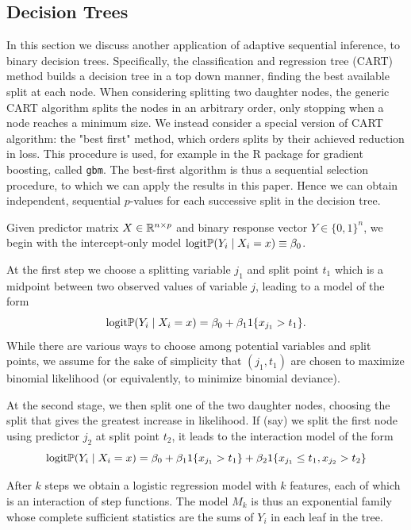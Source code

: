 \documentclass{article}
\begin{document}
\subsection{Decision Trees}
In this section we discuss another application of adaptive sequential inference, to binary decision trees. Specifically, the classification and regression tree  (CART)  method builds a decision tree in a top down manner, finding the best available split at each node.  When considering splitting two daughter nodes, the generic CART algorithm splits the nodes in an arbitrary order, only stopping when a node reaches a minimum size.  We instead consider a  special version of CART  algorithm:  the "best first"  method, which orders splits by their achieved reduction in loss. This procedure is used, for example in the R package for gradient boosting, called {\tt gbm}. The best-first algorithm is thus a sequential selection  procedure, to which we can apply the results in this paper. Hence we can obtain independent, sequential $p$-values for each successive split in the decision tree.

Given predictor matrix $X \in \mathbb{R}^{n\times p}$ and binary response vector $Y\in \{0,1\}^n$, we begin with the intercept-only model $\textrm{logit} \mathbb{P}(Y_i \mid X_i = x) \equiv \beta_0$.

At the first step we choose a splitting variable $j_1$ and split point $t_1$ which is a midpoint between two observed values of variable $j$, leading to a model of the form
\begin{equation}
\textrm{logit} \mathbb{P}(Y_i \mid X_i=x) = \beta_0 + \beta_{1} 1\{x_{j_1} > t_1\}.
\end{equation}
While there are various ways to choose among potential variables and split points, we assume for the sake of simplicity that $(j_1,t_1)$ are chosen to maximize binomial likelihood (or equivalently, to minimize binomial deviance).

At the second stage, we then split one of the two daughter nodes, choosing the split that gives the greatest increase in likelihood. If (say) we split the first node using predictor $j_2$ at split point $t_2$, it leads to the interaction model of the form
\begin{equation}
\textrm{logit} \mathbb{P}(Y_i \mid X_i=x) = \beta_0 + \beta_{1} 1\{x_{j_1} > t_1\} + \beta_2 1\{x_{j_1} \leq t_1, x_{j_2} > t_2\}
\label{eqn:intmodel}
\end{equation}

After $k$ steps we obtain a logistic regression model with $k$ features, each of which is an interaction of step functions. The model $M_k$ is thus an exponential family whose complete sufficient statistics are the sums of $Y_i$ in each leaf in the tree.
\end{document}
